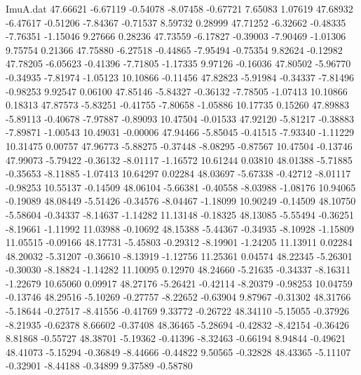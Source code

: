 \begin{filecontents}{ImuA.dat}
  47.66621   -6.67119   -0.54078   -8.07458   -0.67721    7.65083    1.07619
  47.68932   -6.47617   -0.51206   -7.84367   -0.71537    8.59732    0.28999
  47.71252   -6.32662   -0.48335   -7.76351   -1.15046    9.27666    0.28236
  47.73559   -6.17827   -0.39003   -7.90469   -1.01306    9.75754    0.21366
  47.75880   -6.27518   -0.44865   -7.95494   -0.75354    9.82624   -0.12982
  47.78205   -6.05623   -0.41396   -7.71805   -1.17335    9.97126   -0.16036
  47.80502   -5.96770   -0.34935   -7.81974   -1.05123   10.10866   -0.11456
  47.82823   -5.91984   -0.34337   -7.81496   -0.98253    9.92547    0.06100
  47.85146   -5.84327   -0.36132   -7.78505   -1.07413   10.10866    0.18313
  47.87573   -5.83251   -0.41755   -7.80658   -1.05886   10.17735    0.15260
  47.89883   -5.89113   -0.40678   -7.97887   -0.89093   10.47504   -0.01533
  47.92120   -5.81217   -0.38883   -7.89871   -1.00543   10.49031   -0.00006
  47.94466   -5.85045   -0.41515   -7.93340   -1.11229   10.31475    0.00757
  47.96773   -5.88275   -0.37448   -8.08295   -0.87567   10.47504   -0.13746
  47.99073   -5.79422   -0.36132   -8.01117   -1.16572   10.61244    0.03810
  48.01388   -5.71885   -0.35653   -8.11885   -1.07413   10.64297    0.02284
  48.03697   -5.67338   -0.42712   -8.01117   -0.98253   10.55137   -0.14509
  48.06104   -5.66381   -0.40558   -8.03988   -1.08176   10.94065   -0.19089
  48.08449   -5.51426   -0.34576   -8.04467   -1.18099   10.90249   -0.14509
  48.10750   -5.58604   -0.34337   -8.14637   -1.14282   11.13148   -0.18325
  48.13085   -5.55494   -0.36251   -8.19661   -1.11992   11.03988   -0.10692
  48.15388   -5.44367   -0.34935   -8.10928   -1.15809   11.05515   -0.09166
  48.17731   -5.45803   -0.29312   -8.19901   -1.24205   11.13911    0.02284
  48.20032   -5.31207   -0.36610   -8.13919   -1.12756   11.25361    0.04574
  48.22345   -5.26301   -0.30030   -8.18824   -1.14282   11.10095    0.12970
  48.24660   -5.21635   -0.34337   -8.16311   -1.22679   10.65060    0.09917
  48.27176   -5.26421   -0.42114   -8.20379   -0.98253   10.04759   -0.13746
  48.29516   -5.10269   -0.27757   -8.22652   -0.63904    9.87967   -0.31302
  48.31766   -5.18644   -0.27517   -8.41556   -0.41769    9.33772   -0.26722
  48.34110   -5.15055   -0.37926   -8.21935   -0.62378    8.66602   -0.37408
  48.36465   -5.28694   -0.42832   -8.42154   -0.36426    8.81868   -0.55727
  48.38701   -5.19362   -0.41396   -8.32463   -0.66194    8.94844   -0.49621
  48.41073   -5.15294   -0.36849   -8.44666   -0.44822    9.50565   -0.32828
  48.43365   -5.11107   -0.32901   -8.44188   -0.34899    9.37589   -0.58780

\end{filecontents}
